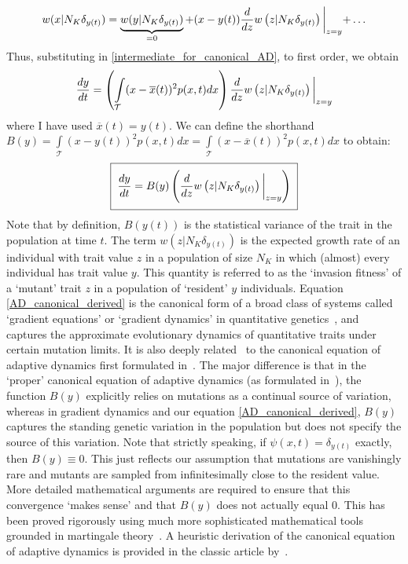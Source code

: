 \begin{equation*}
    w(x|N_K\delta_{y(t)}) = \underbrace{w(y|N_K\delta_{y(t)})}_{=0} + (x-y(t))\frac{d}{dz}w\left(z|N_K\delta_{y(t)}\right)\biggl{|}_{z=y} + \ldots
\end{equation*}
Thus, substituting in \eqref{intermediate_for_canonical_AD}, to first order, we obtain
\begin{equation*}
    \frac{dy}{dt} = \left(\int\limits_{\mathcal{T}}(x-\overline{x}(t))^2p(x,t)dx\right)\frac{d}{dz}w\left(z|N_K\delta_{y(t)}\right)\biggl{|}_{z=y}
\end{equation*}
where I have used $\overline{x}(t) = y(t)$. We can define the shorthand $B(y) =\int\limits_{\mathcal{T}}(x-y(t))^2p(x,t)dx = \int\limits_{\mathcal{T}}(x-\overline{x}(t))^2p(x,t)dx$ to obtain:
\begin{equation}
    \label{AD_canonical_derived}
    \setlength{\fboxsep}{2\fboxsep}\boxed{\frac{dy}{dt} = B(y)\left(\frac{d}{dz}w\left(z|N_K\delta_{y(t)}\right)\biggl{|}_{z=y}\right)}
\end{equation}
Note that by definition, $B(y(t))$ is the statistical variance of the trait in the population at time $t$. The term $w\left(z|N_K\delta_{y(t)}\right)$ is the expected growth rate of an individual with trait value $z$ in a population of size $N_K$ in which (almost) every individual has trait value $y$. This quantity is referred to as the `invasion fitness' of a `mutant' trait $z$ in a population of `resident' $y$ individuals. Equation \eqref{AD_canonical_derived} is the canonical form of a broad class of systems called `gradient equations' or `gradient dynamics' in quantitative genetics~\citep{lande_quantitative_1982, abrams_relationship_1993, lehtonen_price_2018, lion_theoretical_2018}, and captures the approximate evolutionary dynamics of quantitative traits under certain mutation limits.  It is also deeply related~\citep{lehtonen_price_2018, lion_theoretical_2018} to the canonical equation of adaptive dynamics first formulated in~\citet{dieckmann_dynamical_1996}. The major difference is that in the `proper' canonical equation of adaptive dynamics (as formulated in~\citet{dieckmann_dynamical_1996}), the function $B(y)$ explicitly relies on mutations as a continual source of variation, whereas in gradient dynamics and our equation \eqref{AD_canonical_derived}, $B(y)$ captures the standing genetic variation in the population but does not specify the source of this variation. Note that strictly speaking, if $\psi(x,t) = \delta_{y(t)}$ exactly, then $B(y) \equiv 0$. This just reflects our assumption that mutations are vanishingly rare and mutants are sampled from infinitesimally close to the resident value. More detailed mathematical arguments are required to ensure that this convergence `makes sense' and that $B(y)$ does not actually equal 0. This has been proved rigorously using much more sophisticated mathematical tools grounded in martingale theory~\citep{champagnat_unifying_2006}. A heuristic derivation of the canonical equation of adaptive dynamics is provided in the classic article by~\citet{dieckmann_dynamical_1996}.

